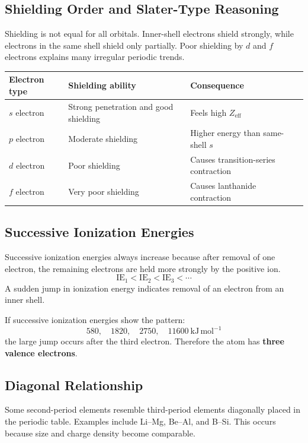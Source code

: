 \documentclass[12pt,a4paper]{article}
\begin{document}
\subsection{Shielding Order and Slater-Type Reasoning}
Shielding is not equal for all orbitals. Inner-shell electrons shield strongly, while electrons in the same shell shield only partially. Poor shielding by $d$ and $f$ electrons explains many irregular periodic trends.

\begin{tabularx}{\linewidth}{|B{3.2cm}|Y|Y|}
\hline
\textbf{Electron type} & \textbf{Shielding ability} & \textbf{Consequence} \\
\hline
$s$ electron & Strong penetration and good shielding & Feels high $Z_{\mathrm{eff}}$ \\
\hline
$p$ electron & Moderate shielding & Higher energy than same-shell $s$ \\
\hline
$d$ electron & Poor shielding & Causes transition-series contraction \\
\hline
$f$ electron & Very poor shielding & Causes lanthanide contraction \\
\hline
\end{tabularx}

\subsection{Successive Ionization Energies}
Successive ionization energies always increase because after removal of one electron, the remaining electrons are held more strongly by the positive ion.
\[
\mathrm{IE_1<IE_2<IE_3<\cdots}
\]
A sudden jump in ionization energy indicates removal of an electron from an inner shell.

\begin{tcolorbox}[examplebox, title={Solved Example: Identifying Valence Electrons}]
If successive ionization energies show the pattern:
\[
580,\quad 1820,\quad 2750,\quad 11600\ \mathrm{kJ\,mol^{-1}}
\]
the large jump occurs after the third electron. Therefore the atom has \textbf{three valence electrons}.
\end{tcolorbox}

\subsection{Diagonal Relationship}
Some second-period elements resemble third-period elements diagonally placed in the periodic table. Examples include Li--Mg, Be--Al, and B--Si. This occurs because size and charge density become comparable.
\end{document}
